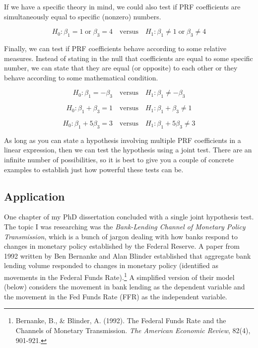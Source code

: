 \documentclass[
]{book}
\begin{document}
If we have a specific theory in mind, we could also test if PRF coefficients are simultaneously equal to specific (nonzero) numbers.

\[H_0: \beta_1 = 1 \; \text{or} \; \beta_3 = 4 \quad \text{versus} \quad H_1: \beta_1 \neq 1\; \text{or} \; \beta_3 \neq 4\]

Finally, we can test if PRF coefficients behave according to some relative measures. Instead of stating in the null that coefficients are equal to some specific number, we can state that they are equal (or opposite) to each other or they behave according to some mathematical condition.

\[H_0: \beta_1 = -\beta_3 \quad \text{versus} \quad H_1: \beta_1 \neq -\beta_3\]

\[H_0: \beta_1 + \beta_3 = 1 \quad \text{versus} \quad H_1: \beta_1 + \beta_3 \neq 1\]

\[H_0: \beta_1 + 5\beta_3 = 3 \quad \text{versus} \quad H_1: \beta_1 + 5\beta_3 \neq 3\]

As long as you can state a hypothesis involving multiple PRF coefficients in a linear expression, then we can test the hypothesis using a joint test. There are an infinite number of possibilities, so it is best to give you a couple of concrete examples to establish just how powerful these tests can be.

\hypertarget{application-7}{%
\subsection*{Application}\label{application-7}}

One chapter of my PhD dissertation concluded with a single joint hypothesis test. The topic I was researching was the \emph{Bank-Lending Channel of Monetary Policy Transmission}, which is a bunch of jargon dealing with how banks respond to changes in monetary policy established by the Federal Reserve. A paper from 1992 written by Ben Bernanke and Alan Blinder established that aggregate bank lending volume responded to changes in monetary policy (identified as movements in the Federal Funds Rate).\footnote{Bernanke, B., \& Blinder, A. (1992). The Federal Funds Rate and the Channels of Monetary Transmission. \emph{The American Economic Review}, 82(4), 901-921.} A simplified version of their model (below) considers the movement in bank lending as the dependent variable and the movement in the Fed Funds Rate (FFR) as the independent variable.
\end{document}
